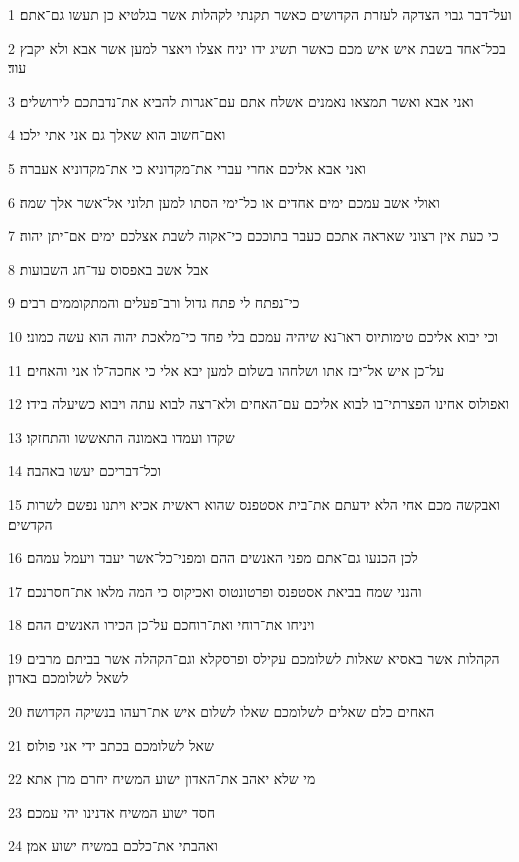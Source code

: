 \par 1 ועל־דבר גבוי הצדקה לעזרת הקדושים כאשר תקנתי לקהלות אשר בגלטיא כן תעשו גם־אתם׃
\par 2 בכל־אחד בשבת איש איש מכם כאשר תשיג ידו יניח אצלו ויאצר למען אשר אבא ולא יקבץ עוד׃
\par 3 ואני אבא ואשר תמצאו נאמנים אשלח אתם עם־אגרות להביא את־נדבתכם לירושלים׃
\par 4 ואם־חשוב הוא שאלך גם אני אתי ילכו׃
\par 5 ואני אבא אליכם אחרי עברי את־מקדוניא כי את־מקדוניא אעברה׃
\par 6 ואולי אשב עמכם ימים אחדים או כל־ימי הסתו למען תלוני אל־אשר אלך שמה׃
\par 7 כי כעת אין רצוני שאראה אתכם כעבר בתוככם כי־אקוה לשבת אצלכם ימים אם־יתן יהוה׃
\par 8 אבל אשב באפסוס עד־חג השבועות׃
\par 9 כי־נפתח לי פתח גדול ורב־פעלים והמתקוממים רבים׃
\par 10 וכי יבוא אליכם טימותיוס ראו־נא שיהיה עמכם בלי פחד כי־מלאכת יהוה הוא עשה כמוני׃
\par 11 על־כן איש אל־יבז אתו ושלחהו בשלום למען יבא אלי כי אחכה־לו אני והאחים׃
\par 12 ואפולוס אחינו הפצרתי־בו לבוא אליכם עם־האחים ולא־רצה לבוא עתה ויבוא כשיעלה בידו׃
\par 13 שקדו ועמדו באמונה התאששו והתחזקו׃
\par 14 וכל־דבריכם יעשו באהבה׃
\par 15 ואבקשה מכם אחי הלא ידעתם את־בית אסטפנס שהוא ראשית אכיא ויתנו נפשם לשרות הקדשים׃
\par 16 לכן הכנעו גם־אתם מפני האנשים ההם ומפני־כל־אשר יעבד ויעמל עמהם׃
\par 17 והנני שמח בביאת אסטפנס ופרטונטוס ואכיקוס כי המה מלאו את־חסרנכם׃
\par 18 ויניחו את־רוחי ואת־רוחכם על־כן הכירו האנשים ההם׃
\par 19 הקהלות אשר באסיא שאלות לשלומכם עקילס ופרסקלא וגם־הקהלה אשר בביתם מרבים לשאל לשלומכם באדון׃
\par 20 האחים כלם שאלים לשלומכם שאלו לשלום איש את־רעהו בנשיקה הקדושה׃
\par 21 שאל לשלומכם בכתב ידי אני פולוס׃
\par 22 מי שלא יאהב את־האדון ישוע המשיח יחרם מרן אתא׃
\par 23 חסד ישוע המשיח אדנינו יהי עמכם׃
\par 24 ואהבתי את־כלכם במשיח ישוע אמן׃


